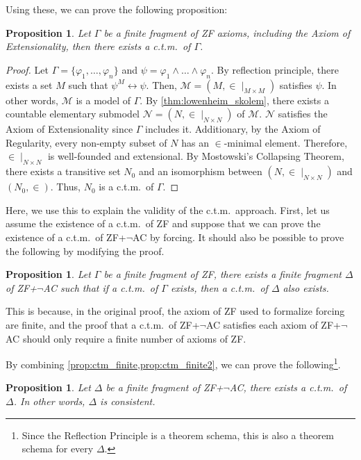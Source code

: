 \documentclass{report}
\newtheorem{prop}[thm]{Proposition}
\begin{document}
Using these, we can prove the following proposition:
\begin{prop}\label{prop:ctm_finite}
  Let $\Gamma$ be a finite fragment of ZF axioms, including the Axiom of Extensionality,
  then there exists a c.t.m.\ of $\Gamma$.
\end{prop}
\begin{proof}
  Let $\Gamma = \{ \varphi_1, \ldots, \varphi_n \}$ and $\psi = \varphi_1 \land \ldots \land \varphi_n$.
  By reflection principle, there exists a set $M$ such that $\psi^M \leftrightarrow \psi$.
  Then, $\mathcal{M} = (M, \in \mid_{M \times M})$ satisfies $\psi$. 
  In other words, $\mathcal{M}$ is a model of $\Gamma$.
  By \cref{thm:lowenheim_skolem}, there exists a countable elementary submodel $\mathcal{N} = (N, \in \mid_{N \times N})$ of $\mathcal{M}$.  
  $\mathcal{N}$ satisfies the Axiom of Extensionality since $\Gamma$ includes it.
  Additionary, by the Axiom of Regularity, every non-empty subset of $N$ has an $\in$-minimal element.
  Therefore, $\in \mid_{N \times N}$ is well-founded and extensional.
  By Mostowski's Collapsing Theorem, there exists a transitive set $N_0$ and an isomorphism between $(N, \in \mid_{N \times N})$ and $(N_0, \in)$.
  Thus, $N_0$ is a c.t.m.\ of $\Gamma$.
\end{proof}

Here, we use this to explain the validity of the c.t.m.\ approach.
First, let us assume the existence of a c.t.m.\  of ZF and 
suppose that we can prove the existence of a c.t.m.\ of ZF+$\neg$AC by forcing.
It should also be possible to prove the following by modifying the proof.

\begin{prop}\label{prop:ctm_finite2}
  Let $\Gamma$ be a finite fragment of ZF, 
  there exists a finite fragment $\Delta$ of ZF+$\neg$AC such that
  if a c.t.m.\  of $\Gamma$ exists, then a c.t.m.\  of $\Delta$ also exists.
\end{prop}

This is because, in the original proof, 
the axiom of ZF used to formalize forcing are finite, 
and the proof that a c.t.m.\ of ZF+$\neg$AC satisfies each axiom of ZF+$\neg$AC should 
only require a finite number of axioms of ZF. 

By combining \cref{prop:ctm_finite,prop:ctm_finite2}, 
we can prove the following\footnote{
  Since the Reflection Principle is a theorem schema,
  this is also a theorem schema for every $\Delta$.
}.
\begin{prop} \label{prop:ctm_finite3}
  Let $\Delta$ be a finite fragment of ZF+$\neg$AC,
  there exists a c.t.m.\  of $\Delta$. 
  In other words, $\Delta$ is consistent.
\end{prop}
\end{document}
